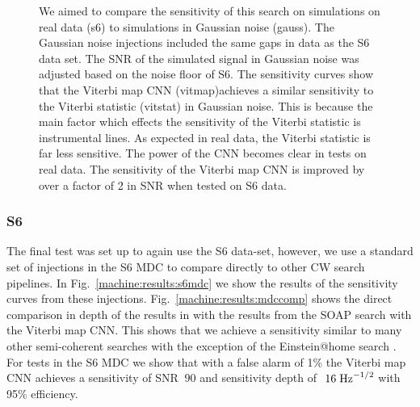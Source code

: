 \begin{figure}
	\caption{\label{machine:results:s6gauss} We aimed to compare the sensitivity of this search on simulations on real data (s6) to simulations in Gaussian noise (gauss). The Gaussian noise injections included the same gaps in data as the S6 data set. The \ac{SNR} of the simulated signal in Gaussian noise was adjusted based on the noise floor of S6. The sensitivity curves show that the Viterbi map \ac{CNN} (vitmap)achieves a similar sensitivity to the Viterbi statistic (vitstat) in Gaussian noise. This is because the main factor which effects the sensitivity of the Viterbi statistic is instrumental lines. As expected in real data, the Viterbi statistic is far less sensitive. The power of the \ac{CNN} becomes clear in tests on real data. The sensitivity of the Viterbi map \ac{CNN} is improved by over a factor of 2 in \ac{SNR} when tested on S6 data.}
	
\end{figure}

\subsubsection{S6}

The final test was set up to again use the S6 data-set, however, we use a standard set of injections in the S6 \ac{MDC} \cite{walsh2016ComparisonMethods} to compare directly to other \ac{CW} search pipelines. In Fig.~\ref{machine:results:s6mdc} we show the results of the sensitivity curves from these injections. Fig.~\ref{machine:results:mdccomp} shows the direct comparison in depth of the results in \cite{walsh2016ComparisonMethods} with the results from the SOAP search with the Viterbi map \ac{CNN}. This shows that we achieve a sensitivity similar to many other semi-coherent searches with the exception of the Einstein@home search \cite{abbott2016ResultsDeepest}. For tests in the S6 \ac{MDC} we show that with a false alarm of 1\% the Viterbi map \ac{CNN} achieves a sensitivity of SNR $~90$ and sensitivity depth of $~16\; {\rm Hz}^{-1/2}$ with 95\% efficiency.



